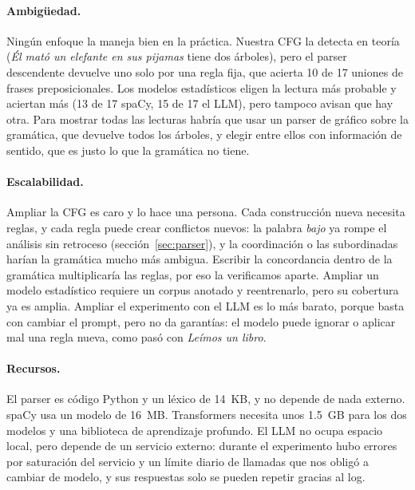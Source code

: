 \paragraph{Ambigüedad.} Ningún enfoque la maneja bien en la práctica. Nuestra CFG la detecta en
teoría (\emph{Él mató un elefante en sus pijamas} tiene dos árboles), pero el parser
descendente devuelve uno solo por una regla fija, que acierta 10 de 17 uniones de frases
preposicionales. Los modelos estadísticos eligen la lectura más probable y aciertan más (13 de
17 spaCy, 15 de 17 el LLM), pero tampoco avisan que hay otra. Para mostrar todas las lecturas
habría que usar un parser de gráfico sobre la gramática, que devuelve todos los árboles, y
elegir entre ellos con información de sentido, que es justo lo que la gramática no tiene.

\paragraph{Escalabilidad.} Ampliar la CFG es caro y lo hace una persona. Cada construcción nueva
necesita reglas, y cada regla puede crear conflictos nuevos: la palabra \emph{bajo} ya rompe el
análisis sin retroceso (sección~\ref{sec:parser}), y la coordinación o las subordinadas harían la
gramática mucho más ambigua. Escribir la concordancia dentro de la gramática multiplicaría las
reglas, por eso la verificamos aparte. Ampliar un modelo estadístico requiere un corpus anotado y
reentrenarlo, pero su cobertura ya es amplia. Ampliar el experimento con el LLM es lo más barato,
porque basta con cambiar el prompt, pero no da garantías: el modelo puede ignorar o aplicar mal
una regla nueva, como pasó con \emph{Leímos un libro}.

\paragraph{Recursos.} El parser es código Python y un léxico de 14~KB, y no depende de nada
externo. spaCy usa un modelo de 16~MB. Transformers necesita unos 1.5~GB para los dos modelos
y una biblioteca de aprendizaje profundo. El LLM no ocupa espacio local, pero depende de un
servicio externo: durante el experimento hubo errores por saturación del servicio y un límite
diario de llamadas que nos obligó a cambiar de modelo, y sus respuestas solo se pueden repetir
gracias al log.
